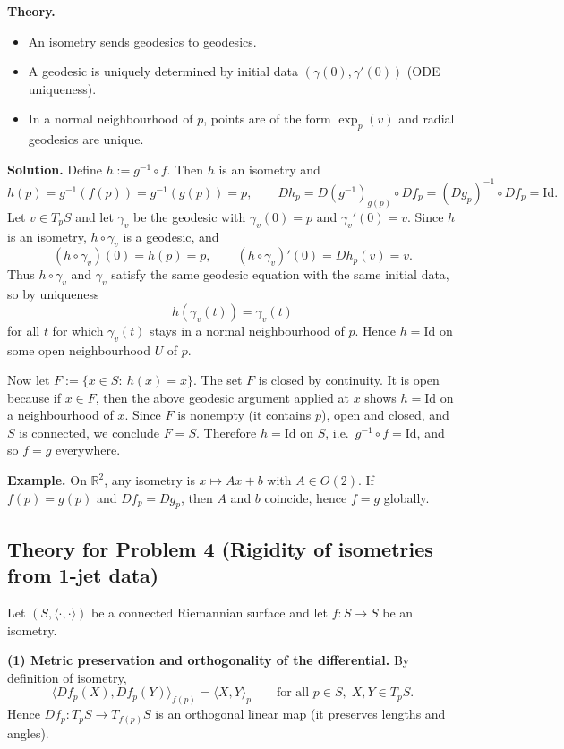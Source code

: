 \documentclass[12pt,a4paper]{article}
\theoremstyle{plain}
\theoremstyle{definition}      %
\begin{document}
\medskip
\textbf{Theory.}
\begin{itemize}
	\item An isometry sends geodesics to geodesics.
	\item A geodesic is uniquely determined by initial data $(\gamma(0),\gamma'(0))$ (ODE uniqueness).
	\item In a normal neighbourhood of $p$, points are of the form $\exp_p(v)$ and radial geodesics are unique.
\end{itemize}

\medskip
\textbf{Solution.}
Define $h:=g^{-1}\circ f$. Then $h$ is an isometry and
\[
h(p)=g^{-1}(f(p))=g^{-1}(g(p))=p,
\qquad
Dh_p=D(g^{-1})_{g(p)}\circ Df_p=(Dg_p)^{-1}\circ Df_p=\mathrm{Id}.
\]
Let $v\in T_pS$ and let $\gamma_v$ be the geodesic with $\gamma_v(0)=p$ and $\gamma_v'(0)=v$.
Since $h$ is an isometry, $h\circ\gamma_v$ is a geodesic, and
\[
(h\circ\gamma_v)(0)=h(p)=p,\qquad (h\circ\gamma_v)'(0)=Dh_p(v)=v.
\]
Thus $h\circ\gamma_v$ and $\gamma_v$ satisfy the same geodesic equation with the same initial data,
so by uniqueness
\[
h(\gamma_v(t))=\gamma_v(t)
\]
for all $t$ for which $\gamma_v(t)$ stays in a normal neighbourhood of $p$.
Hence $h=\mathrm{Id}$ on some open neighbourhood $U$ of $p$.

Now let $F:=\{x\in S:\ h(x)=x\}$. The set $F$ is closed by continuity. It is open because if $x\in F$,
then the above geodesic argument applied at $x$ shows $h=\mathrm{Id}$ on a neighbourhood of $x$.
Since $F$ is nonempty (it contains $p$), open and closed, and $S$ is connected, we conclude $F=S$.
Therefore $h=\mathrm{Id}$ on $S$, i.e.\ $g^{-1}\circ f=\mathrm{Id}$, and so $f=g$ everywhere.

\medskip
\textbf{Example.}
On $\mathbb{R}^2$, any isometry is $x\mapsto Ax+b$ with $A\in O(2)$.
If $f(p)=g(p)$ and $Df_p=Dg_p$, then $A$ and $b$ coincide, hence $f=g$ globally.


\subsection*{Theory for Problem 4 (Rigidity of isometries from 1-jet data)}

Let $(S,\langle\cdot,\cdot\rangle)$ be a connected Riemannian surface and let $f:S\to S$ be an isometry.

\medskip
\textbf{(1) Metric preservation and orthogonality of the differential.}
By definition of isometry,
\[
\langle Df_p(X),Df_p(Y)\rangle_{f(p)}=\langle X,Y\rangle_p
\qquad\text{for all }p\in S,\;X,Y\in T_pS.
\]
Hence $Df_p:T_pS\to T_{f(p)}S$ is an orthogonal linear map (it preserves lengths and angles).
\end{document}
